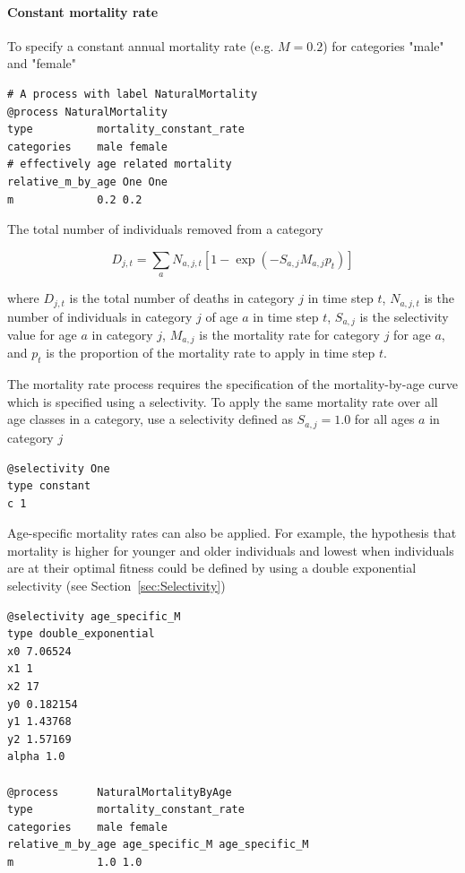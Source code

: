 \paragraph{Constant mortality rate}\label{sec:Process-MortalityConstantRate} 

To specify a constant annual mortality rate (e.g. $M=0.2$) for categories "male" and "female"

{\small{\begin{verbatim}
# A process with label NaturalMortality
@process NaturalMortality
type          mortality_constant_rate
categories    male female
# effectively age related mortality
relative_m_by_age One One
m             0.2 0.2
\end{verbatim}}}

The total number of individuals removed from a category

\begin{equation}
D_{j,t} = \sum_a N_{a,j,t} [1 - \exp(-S_{a,j} M_{a,j} p_t)]
\end{equation}

where $D_{j,t}$ is the total number of deaths in category $j$ in time step $t$, $N_{a,j,t}$ is the number of individuals in category $j$ of age $a$ in time step $t$, $S_{a,j}$ is the selectivity value for age $a$ in category $j$, $M_{a,j}$ is the mortality rate for category $j$ for age $a$, and $p_t$ is the proportion of the mortality rate to apply in time step $t$.

The mortality rate process requires the specification of the mortality-by-age curve which is specified using a selectivity. To apply the same mortality rate over all age classes in a category, use a selectivity defined as $S_{a,j}=1.0$ for all ages $a$ in category $j$

{\small{\begin{verbatim}
@selectivity One
type constant
c 1
\end{verbatim}}}

Age-specific mortality rates can also be applied. For example, the hypothesis that mortality is higher for younger and older individuals and lowest when individuals are at their optimal fitness could be defined by using a double exponential selectivity (see Section~\ref{sec:Selectivity})

{\small{\begin{verbatim}
@selectivity age_specific_M
type double_exponential
x0 7.06524
x1 1
x2 17
y0 0.182154
y1 1.43768
y2 1.57169
alpha 1.0

@process      NaturalMortalityByAge
type          mortality_constant_rate
categories    male female
relative_m_by_age age_specific_M age_specific_M
m             1.0 1.0
\end{verbatim}}}

